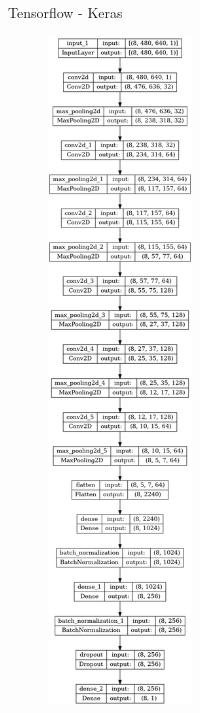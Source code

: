 \documentclass[aspectratio=169]{beamer}
\begin{document}
\begin{frame}{Tensorflow - Keras}
    \begin{figure}
        \centering
        \includegraphics[trim={0 51cm 0 0},clip,width=3.8cm]{model_plot.png} \hfill

\end{figure}
\end{frame}
\end{document}
